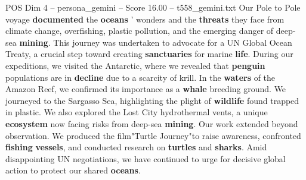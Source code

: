\begin{textsample}{POS Dim 4 – persona\_gemini – Score 16.00 – t558\_gemini.txt}  \label{ex:f4_pos_044}
Our Pole to Pole voyage \textbf{documented} the \textbf{oceans} ' wonders and the \textbf{threats} they face from climate change, overfishing, plastic pollution, and the emerging danger of deep-sea \textbf{mining}.
This journey was undertaken to advocate for a UN Global Ocean Treaty, a crucial step toward creating \textbf{sanctuaries} for marine \textbf{life}.
During our expeditions, we visited the Antarctic, where we revealed that \textbf{penguin} populations are in \textbf{decline} due to a scarcity of krill.
In the \textbf{waters} of the Amazon Reef, we confirmed its importance as a \textbf{whale} breeding ground.
We journeyed to the Sargasso Sea, highlighting the plight of \textbf{wildlife} found trapped in plastic.
We also explored the Lost City hydrothermal vents, a unique \textbf{ecosystem} now facing risks from deep-sea \textbf{mining}.
Our work extended beyond observation.
We produced the film"Turtle Journey"to raise awareness, confronted \textbf{fishing} \textbf{vessels}, and conducted research on \textbf{turtles} and \textbf{sharks}.
Amid disappointing UN negotiations, we have continued to urge for decisive global action to protect our shared \textbf{oceans}.

\end{textsample}
